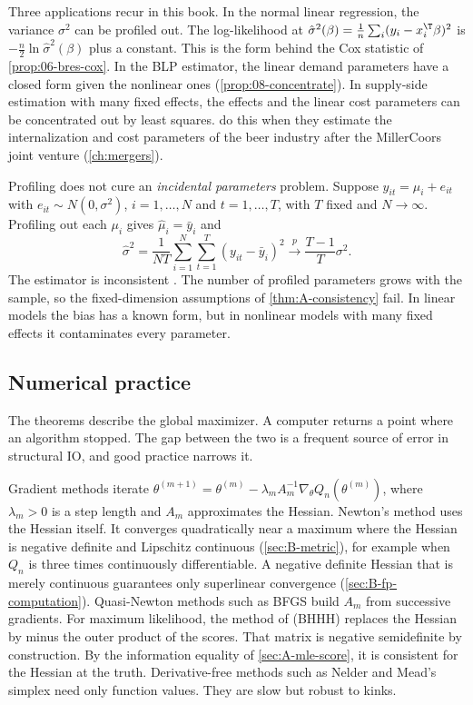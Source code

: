 Three applications recur in this book. In the normal linear regression, the variance $\sigma^2$ can be profiled out. The
log-likelihood at $\hat\sigma^2(\beta) = \frac{1}{n}\sum_i(y_i - x_i^\T\beta)^2$ is $-\frac{n}{2}\ln\hat\sigma^2(\beta)$ plus a
constant. This is the form behind the Cox statistic of \cref{prop:06-bres-cox}. In the BLP estimator, the linear demand
parameters have a closed form given the nonlinear ones (\cref{prop:08-concentrate}). In supply-side estimation with many
fixed effects, the effects and the linear cost parameters can be concentrated out by least squares.
\citet[p.~1780]{MillerWeinberg2017} do this when they estimate the internalization and cost parameters of the beer
industry after the MillerCoors joint venture (\cref{ch:mergers}).

Profiling does not cure an \emph{incidental parameters} problem. Suppose $y_{it} = \mu_i + e_{it}$ with
$e_{it} \sim N(0, \sigma^2)$, $i = 1, \dots, N$ and $t = 1, \dots, T$, with $T$ fixed and $N \to \infty$. Profiling out each
$\mu_i$ gives $\hat\mu_i = \bar y_i$ and
\begin{equation*}
  \hat\sigma^2 = \frac{1}{NT}\sum_{i=1}^N\sum_{t=1}^T(y_{it} - \bar y_i)^2 \xrightarrow{p} \frac{T - 1}{T}\sigma^2.
\end{equation*}
The estimator is inconsistent \citep{NeymanScott1948}. The number of profiled parameters grows with the sample, so the
fixed-dimension assumptions of \cref{thm:A-consistency} fail. In linear models the bias has a known form, but in nonlinear
models with many fixed effects it contaminates every parameter.

\subsection{Numerical practice}\label{sec:A-numerical}

The theorems describe the global maximizer. A computer returns a point where an algorithm stopped. The gap between the
two is a frequent source of error in structural IO, and good practice narrows it.

Gradient methods iterate $\theta^{(m+1)} = \theta^{(m)} - \lambda_m A_m^{-1}\nabla_\theta Q_n(\theta^{(m)})$, where
$\lambda_m > 0$ is a step length and $A_m$ approximates the Hessian. Newton's method uses the Hessian itself. It
converges quadratically near a maximum where the Hessian is negative definite and Lipschitz continuous
(\cref{sec:B-metric}), for example when $Q_n$ is three times continuously differentiable. A negative definite Hessian
that is merely continuous guarantees only superlinear convergence (\cref{sec:B-fp-computation}). Quasi-Newton methods such as BFGS build $A_m$ from
successive gradients. For maximum likelihood, the method of \citet{BerndtEtAl1974} (BHHH) replaces the Hessian by minus
the outer product of the scores. That matrix is negative semidefinite by construction. By the information equality of
\cref{sec:A-mle-score}, it is consistent for the Hessian at the truth. Derivative-free methods such as Nelder and Mead's simplex need only
function values. They are slow but robust to kinks.

